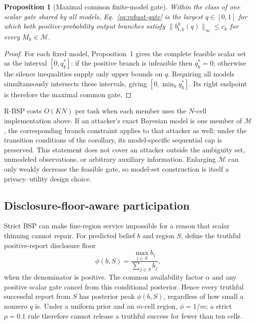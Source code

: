 \documentclass[review,11pt,times]{elsarticle}
\newtheorem{proposition}{Proposition}
\begin{document}
\begin{proposition}[Maximal common finite-model gate]
Within the class of one scalar gate shared by all models, Eq.~\eqref{eq:robust-gate} is the largest $q\in[0,1]$ for which both positive-probability output branches satisfy $\|b_{t,k}^{y}(q)\|_\infty\le c_k$ for every $M_k\in\mathcal M$.
\end{proposition}
\begin{proof}
For each fixed model, Proposition~1 gives the complete feasible scalar set as the interval $[0,q_k^*]$: if the positive branch is infeasible then $q_k^*=0$; otherwise the silence inequalities supply only upper bounds on $q$. Requiring all models simultaneously intersects these intervals, giving $[0,\min_k q_k^*]$. Its right endpoint is therefore the maximal common gate.
\end{proof}

R-BSP costs $O(KN)$ per task when each member uses the $N$-cell implementation above. If an attacker's exact Bayesian model is one member of $\mathcal M$, the corresponding branch constraint applies to that attacker as well; under the transition conditions of the corollary, its model-specific sequential cap is preserved. This statement does not cover an attacker outside the ambiguity set, unmodeled observations, or arbitrary auxiliary information. Enlarging $\mathcal M$ can only weakly decrease the feasible gate, so model-set construction is itself a privacy--utility design choice.

\subsection{Disclosure-floor-aware participation}
\label{sec:dfbsp}
Strict BSP can make fine-region service impossible for a reason that scalar thinning cannot repair. For predicted belief $b$ and region $S$, define the truthful positive-report disclosure floor
\begin{equation}
 \phi(b,S)=\frac{\max_{i\in S}b_i}{\sum_{j\in S}b_j},
 \label{eq:floor}
\end{equation}
when the denominator is positive. The common availability factor $\alpha$ and any positive scalar gate cancel from this conditional posterior. Hence every truthful successful report from $S$ has posterior peak $\phi(b,S)$, regardless of how small a nonzero $q$ is. Under a uniform prior and an $m$-cell region, $\phi=1/m$; a strict $\rho=0.1$ rule therefore cannot release a truthful success for fewer than ten cells.
\end{document}
